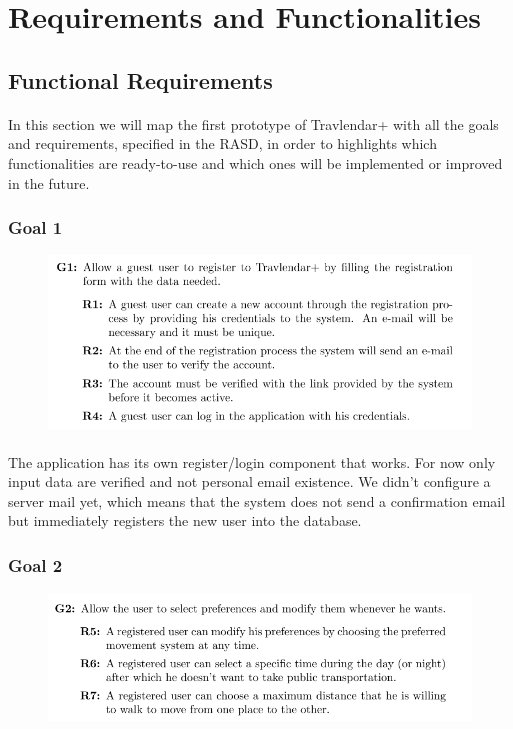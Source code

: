 \documentclass{article}
\begin{document}
	\section{Requirements and Functionalities}
		\subsection{Functional Requirements}
		\paragraph{}In this section we will map the first prototype of Travlendar+ with all the goals and requirements, specified in the RASD, in order to highlights which functionalities are ready-to-use and which ones will be implemented or improved in the future.
			\subsubsection{Goal 1}
			\begin{figure}[H]
			\includegraphics[width=\linewidth]{Images/Goals/Goal_1.png}
			\label{fig:G1}
			\end{figure}
		\paragraph{}The application has its own register/login component that works. For now only input data are verified and not personal email existence. We didn't configure a server mail yet, which means that the system does not send a confirmation email but immediately registers the new user into the database.
			\subsubsection{Goal 2}
			\begin{figure}[H]
			\includegraphics[width=\linewidth]{Images/Goals/Goal_2.png}
			\label{fig:G2}
			\end{figure}
\end{document}
